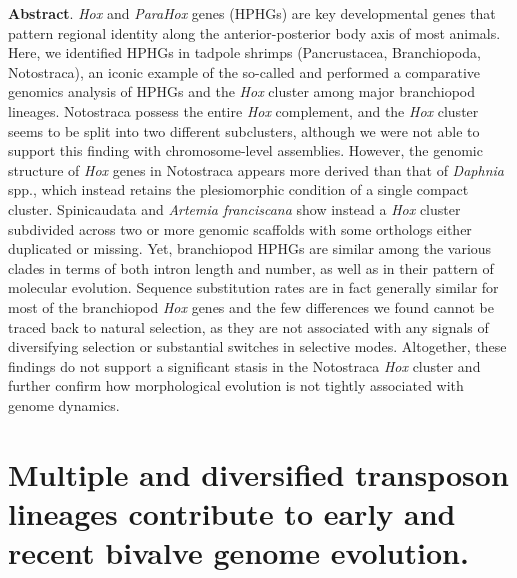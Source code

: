 \textbf{Abstract}. \textit{Hox} and \textit{ParaHox} genes (HPHGs) are key developmental genes that pattern regional identity along the anterior-posterior body axis of most animals. Here, we identified HPHGs in tadpole shrimps (Pancrustacea, Branchiopoda, Notostraca), an iconic example of the so-called  and performed a comparative genomics analysis of HPHGs and the \textit{Hox} cluster among major branchiopod lineages. Notostraca possess the entire \textit{Hox} complement, and the \textit{Hox} cluster seems to be split into two different subclusters, although we were not able to support this finding with chromosome-level assemblies. However, the genomic structure of \textit{Hox} genes in Notostraca appears more derived than that of \textit{Daphnia} spp., which instead retains the plesiomorphic condition of a single compact cluster. Spinicaudata and \textit{Artemia franciscana} show instead a \textit{Hox} cluster subdivided across two or more genomic scaffolds with some orthologs either duplicated or missing. Yet, branchiopod HPHGs are similar among the various clades in terms of both intron length and number, as well as in their pattern of molecular evolution. Sequence substitution rates are in fact generally similar for most of the branchiopod \textit{Hox} genes and the few differences we found cannot be traced back to natural selection, as they are not associated with any signals of diversifying selection or substantial switches in selective modes. Altogether, these findings do not support a significant stasis in the Notostraca \textit{Hox} cluster and further confirm how morphological evolution is not tightly associated with genome dynamics.

\clearpage


{
	\section*{\LARGE{Multiple and diversified transposon lineages contribute to early and recent bivalve genome evolution.}}

	\vspace{4mm}


	\vspace{4mm}



	\vspace{4mm}

}

